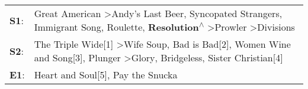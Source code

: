 \begin{supertabular}{p{0.03\textwidth}p{0.92\textwidth}}
 \textbf{S1}:  &  Great American\textsuperscript{} \textgreater \enspace Andy's Last Beer\textsuperscript{}, \enspace Syncopated Strangers\textsuperscript{}, \enspace Immigrant Song\textsuperscript{}, \enspace Roulette\textsuperscript{}, \enspace \textbf{Resolution\textsuperscript{$\wedge$}} \textgreater \enspace Prowler\textsuperscript{} \textgreater \enspace Divisions\textsuperscript{}  \enspace  \\
 \textbf{S2}:  &                          The Triple Wide[1]\textsuperscript{} \textgreater \enspace Wife Soup\textsuperscript{}, \enspace Bad is Bad[2]\textsuperscript{}, \enspace Women Wine and Song[3]\textsuperscript{}, \enspace Plunger\textsuperscript{} \textgreater \enspace Glory\textsuperscript{}, \enspace Bridgeless\textsuperscript{}, \enspace Sister Christian[4]\textsuperscript{}  \enspace  \\
 \textbf{E1}:  &                                                                                                                                                                                                                                                                                                        Heart and Soul[5]\textsuperscript{}, \enspace Pay the Snucka\textsuperscript{}  \enspace  \\
\end{supertabular}

